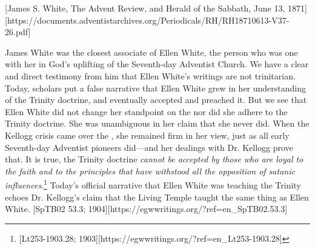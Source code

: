 [James S. White, The Advent Review, and Herald of the Sabbath, June 13, 1871][https://documents.adventistarchives.org/Periodicals/RH/RH18710613-V37-26.pdf]


James White was the closest associate of Ellen White, the person who was one with her in God’s uplifting of the Seventh-day Adventist Church. We have a clear and direct testimony from him that Ellen White’s writings are not trinitarian. Today, scholars put a false narrative that Ellen White grew in her understanding of the Trinity doctrine, and eventually accepted and preached it. But we see that Ellen White did not change her standpoint on the  nor did she adhere to the Trinity doctrine. She was unambiguous in her claim that she never did. When the Kellogg crisis came over the , she remained firm in her view, just as all early Seventh-day Adventist pioneers did—and her dealings with Dr. Kellogg prove that. It is true, the Trinity doctrine \textit{cannot be accepted by those who are loyal to the faith and to the principles that have withstood all the opposition of satanic influences}.\footnote{[Lt253-1903.28; 1903][https://egwwritings.org/?ref=en\_Lt253-1903.28]} Today’s official narrative that Ellen White was teaching the Trinity echoes Dr. Kellogg’s claim that the Living Temple taught the same thing as Ellen White. [SpTB02 53.3; 1904][https://egwwritings.org/?ref=en\_SpTB02.53.3]


